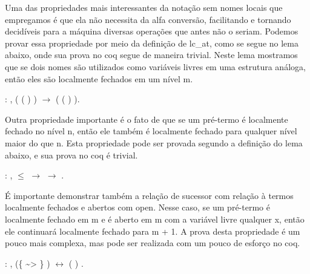  Uma das propriedades mais interessantes da notação sem nomes locais que empregamos é que ela não necessita da alfa conversão,
facilitando e tornando decidíveis para a máquina diversas operações que antes não o seriam. Podemos
provar essa propriedade por meio da definição de lc\_at, como se segue no lema abaixo, onde sua prova no coq segue de maneira trivial. Neste
lema mostramos que se dois nomes são utilizados como variáveis livres em uma estrutura análoga, então eles são localmente fechados em um nível m.  \begin{coqdoccode}
\coqdocemptyline
\coqdocnoindent
{} : \coqdockw{\ensuremath{\forall}}     ,   (  ( ) ) \ensuremath{\rightarrow}   (  ( ) ).\coqdoceol
\coqdocemptyline
\coqdocemptyline
\end{coqdoccode}
Outra propriedade importante é o fato de que se um pré-termo é localmente fechado no nível n, então ele também é localmente fechado
para qualquer nível maior do que n. Esta propriedade pode ser provada segundo a definição do lema abaixo, e sua prova no coq é trivial.\begin{coqdoccode}
\coqdocemptyline
\coqdocnoindent
{} : \coqdockw{\ensuremath{\forall}}   ,  \ensuremath{\le}  \ensuremath{\rightarrow}    \ensuremath{\rightarrow}   .\coqdoceol
\coqdocemptyline
\coqdocemptyline
\end{coqdoccode}
É importante demonstrar também a relação de sucessor com relação à termos localmente fechados e abertos com open. Nesse caso,
se um pré-termo é localmente fechado em m e é aberto em m com a variável livre qualquer x, então ele continuará localmente fechado para
m + 1. A prova desta propriedade é um pouco mais complexa, mas pode ser realizada com um pouco de esforço no coq.\begin{coqdoccode}
\coqdocemptyline
\coqdocnoindent
{} : \coqdockw{\ensuremath{\forall}}   ,   (\{ \~{}>  \} ) \ensuremath{\leftrightarrow}  ( ) .\coqdoceol
\coqdocemptyline
\end{coqdoccode}
